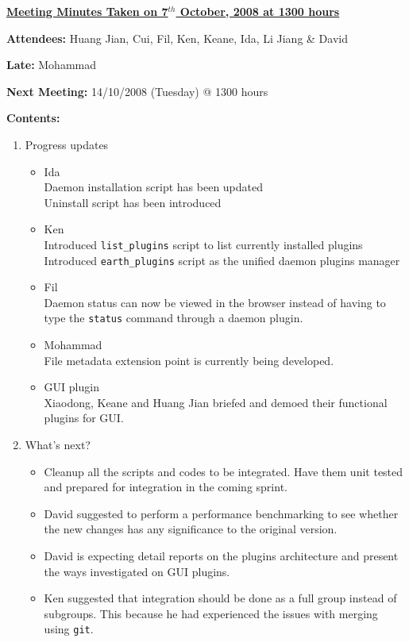 \documentclass{letter}
\begin{document}
{\large \textbf{\underline{Meeting Minutes Taken on 7$^{th}$ October, 2008 at 1300 hours}}}

\textbf{Attendees:} Huang Jian, Cui, Fil, Ken, Keane, Ida, Li Jiang \& David

\textbf{Late:} Mohammad

\textbf{Next Meeting:} 14/10/2008 (Tuesday) @ 1300 hours

\textbf{Contents:}

\begin{enumerate}
    \item Progress updates
        \begin{itemize}
            \item Ida \\ 
                    Daemon installation script has been updated \\
                    Uninstall script has been introduced
            \item Ken \\
                    Introduced \texttt{list\_plugins} script to list currently installed plugins \\
                    Introduced \texttt{earth\_plugins} script as the unified daemon plugins manager
            \item Fil \\
                    Daemon status can now be viewed in the browser instead of having to type the \texttt{status} command through a daemon plugin. 
            \item Mohammad \\
                    File metadata extension point is currently being developed.
            \item GUI plugin \\
                    Xiaodong, Keane and Huang Jian briefed and demoed their functional plugins for GUI.
        \end{itemize}
    \item What's next?
        \begin{itemize}
            \item Cleanup all the scripts and codes to be integrated. Have them unit tested and prepared for integration in the coming sprint. 
            \item David suggested to perform a performance benchmarking to see whether the new changes has any significance to the original version. 
            \item David is expecting detail reports on the plugins architecture and present the ways investigated on GUI plugins. 
            \item Ken suggested that integration should be done as a full group instead of subgroups. This because he had experienced the issues with merging using \texttt{git}.
        \end{itemize}
\end{enumerate} 
\end{document}
